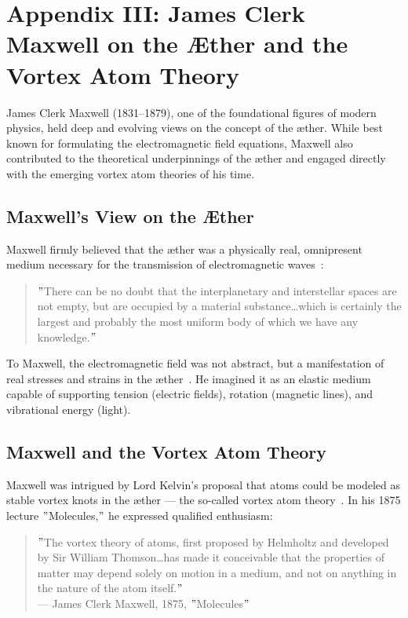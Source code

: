 \section*{Appendix III: James Clerk Maxwell on the Æther and the Vortex Atom Theory}

James Clerk Maxwell (1831–1879), one of the foundational figures of modern physics, held deep and evolving views on the concept of the æther. While best known for formulating the electromagnetic field equations, Maxwell also contributed to the theoretical underpinnings of the æther and engaged directly with the emerging vortex atom theories of his time.

\subsection*{Maxwell's View on the Æther}
Maxwell firmly believed that the æther was a physically real, omnipresent medium necessary for the transmission of electromagnetic waves~\cite{maxwell1878britannica}:

\begin{quote}
\("\)There can be no doubt that the interplanetary and interstellar spaces are not empty, but are occupied by a material substance\ldots which is certainly the largest and probably the most uniform body of which we have any knowledge.\("\)
\end{quote}

To Maxwell, the electromagnetic field was not abstract, but a manifestation of real stresses and strains in the æther~\cite{maxwell1878britannica}. He imagined it as an elastic medium capable of supporting tension (electric fields), rotation (magnetic lines), and vibrational energy (light).

\subsection*{Maxwell and the Vortex Atom Theory}

Maxwell was intrigued by Lord Kelvin's proposal that atoms could be modeled as stable vortex knots in the æther — the so-called vortex atom theory~\cite{maxwell1875molecules}. In his 1875 lecture \("\)Molecules,\("\) he expressed qualified enthusiasm:

\begin{quote}
\("\)The vortex theory of atoms, first proposed by Helmholtz and developed by Sir William Thomson\ldots has made it conceivable that the properties of matter may depend solely on motion in a medium, and not on anything in the nature of the atom itself.\("\)
\\— James Clerk Maxwell, 1875, \("\)Molecules\("\)
\end{quote}

